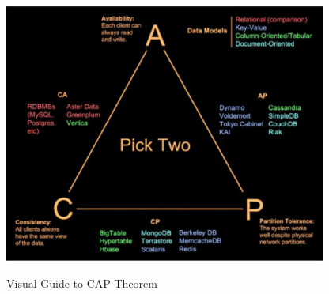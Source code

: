 \documentclass[10pt,a4paper]{article}
\begin{document}
\begin{figure}[h!]
 \hfill \includegraphics[width=300pt]{images/cap-theorem.png}\hspace*{\fill}
  \label{fig:cap-theorem}
  \caption{Visual Guide to CAP Theorem}
\end{figure} \\ \pagebreak
\end{document}

